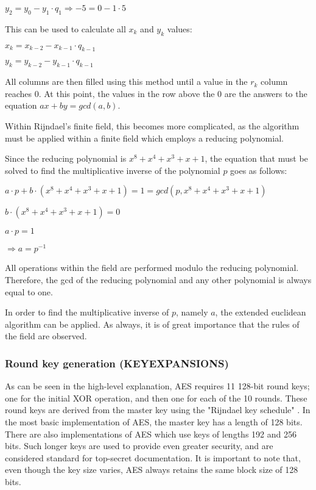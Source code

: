 \documentclass[12pt, a4paper]{report}
\theoremstyle{definition}
\theoremstyle{remark}
\begin{document}
$y_2=y_0-y_1 \cdot q_1 \Rightarrow -5=0-1 \cdot 5$

This can be used to calculate all $x_k$ and $y_k$ values\cite{EuclidGeneralization}:

$x_k=x_{k-2}-x_{k-1} \cdot q_{k-1}$

$y_k=y_{k-2}-y_{k-1} \cdot q_{k-1}$

All columns are then filled using this method until a value in the $r_k$ column reaches 0. At this point, the values in the row above the 0 are the answers to the equation $ax+by = gcd(a,b)$.

Within Rijndael’s finite field, this becomes more complicated, as the algorithm must be applied within a finite field which employs a reducing polynomial.

Since the reducing polynomial is $x^8+x^4+x^3+x+1$, the equation that must be solved to find the multiplicative inverse of the polynomial $p$ goes as follows:

$a \cdot p+b \cdot (x^8+x^4+x^3+x+1) = 1 = gcd(p, x^8+x^4+x^3+x+1)$

$b \cdot ( x^8+x^4+x^3+x+1) = 0$

$a \cdot p = 1$

$\Rightarrow a = p^{-1}$

All operations within the field are performed modulo the reducing polynomial. Therefore, the gcd of the reducing polynomial and any other polynomial is always equal to one.

In order to find the multiplicative inverse of $p$, namely $a$, the extended euclidean algorithm can be applied. As always, it is of great importance that the rules of the field are observed.

\subsubsection{Round key generation (KEYEXPANSIONS)}
\label{KeyExpansions}
As can be seen in the high-level explanation, AES requires 11 128-bit round keys; one for the initial XOR operation, and then one for each of the 10 rounds. These round keys are derived from the master key using the "Rijndael key schedule" \cite{KeySchedule}. In the most basic implementation of AES, the master key has a length of 128 bits. There are also implementations of AES which use keys of lengths 192 and 256 bits. Such longer keys are used to provide even greater security, and are considered standard for top-secret documentation\cite{CNSSPolicy}. It is important to note that, even though the key size varies, AES always retains the same block size of 128 bits.
\end{document}
